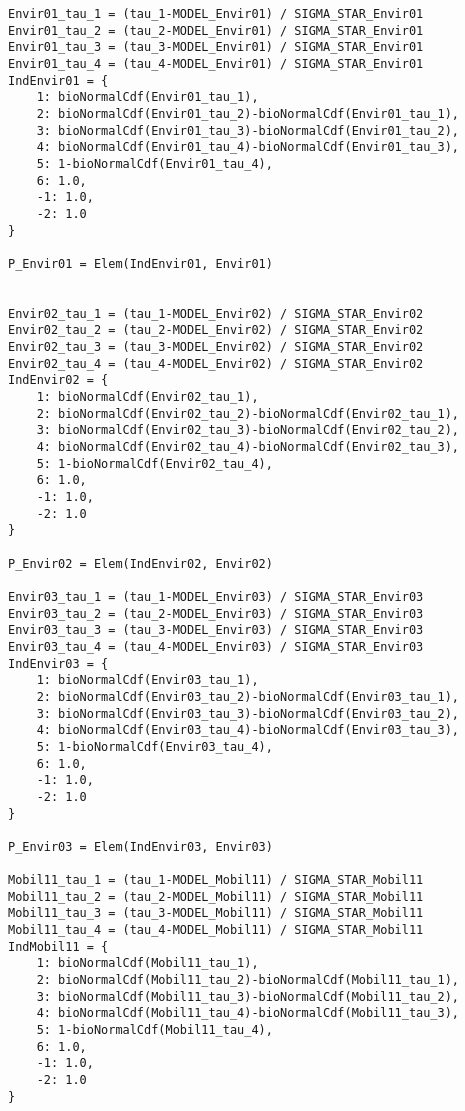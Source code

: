\documentclass[12pt,a4paper]{article}
\begin{document}
\begin{lstlisting}[style=numbers]
Envir01_tau_1 = (tau_1-MODEL_Envir01) / SIGMA_STAR_Envir01
Envir01_tau_2 = (tau_2-MODEL_Envir01) / SIGMA_STAR_Envir01
Envir01_tau_3 = (tau_3-MODEL_Envir01) / SIGMA_STAR_Envir01
Envir01_tau_4 = (tau_4-MODEL_Envir01) / SIGMA_STAR_Envir01
IndEnvir01 = {
    1: bioNormalCdf(Envir01_tau_1),
    2: bioNormalCdf(Envir01_tau_2)-bioNormalCdf(Envir01_tau_1),
    3: bioNormalCdf(Envir01_tau_3)-bioNormalCdf(Envir01_tau_2),
    4: bioNormalCdf(Envir01_tau_4)-bioNormalCdf(Envir01_tau_3),
    5: 1-bioNormalCdf(Envir01_tau_4),
    6: 1.0,
    -1: 1.0,
    -2: 1.0
}

P_Envir01 = Elem(IndEnvir01, Envir01)


Envir02_tau_1 = (tau_1-MODEL_Envir02) / SIGMA_STAR_Envir02
Envir02_tau_2 = (tau_2-MODEL_Envir02) / SIGMA_STAR_Envir02
Envir02_tau_3 = (tau_3-MODEL_Envir02) / SIGMA_STAR_Envir02
Envir02_tau_4 = (tau_4-MODEL_Envir02) / SIGMA_STAR_Envir02
IndEnvir02 = {
    1: bioNormalCdf(Envir02_tau_1),
    2: bioNormalCdf(Envir02_tau_2)-bioNormalCdf(Envir02_tau_1),
    3: bioNormalCdf(Envir02_tau_3)-bioNormalCdf(Envir02_tau_2),
    4: bioNormalCdf(Envir02_tau_4)-bioNormalCdf(Envir02_tau_3),
    5: 1-bioNormalCdf(Envir02_tau_4),
    6: 1.0,
    -1: 1.0,
    -2: 1.0
}

P_Envir02 = Elem(IndEnvir02, Envir02)

Envir03_tau_1 = (tau_1-MODEL_Envir03) / SIGMA_STAR_Envir03
Envir03_tau_2 = (tau_2-MODEL_Envir03) / SIGMA_STAR_Envir03
Envir03_tau_3 = (tau_3-MODEL_Envir03) / SIGMA_STAR_Envir03
Envir03_tau_4 = (tau_4-MODEL_Envir03) / SIGMA_STAR_Envir03
IndEnvir03 = {
    1: bioNormalCdf(Envir03_tau_1),
    2: bioNormalCdf(Envir03_tau_2)-bioNormalCdf(Envir03_tau_1),
    3: bioNormalCdf(Envir03_tau_3)-bioNormalCdf(Envir03_tau_2),
    4: bioNormalCdf(Envir03_tau_4)-bioNormalCdf(Envir03_tau_3),
    5: 1-bioNormalCdf(Envir03_tau_4),
    6: 1.0,
    -1: 1.0,
    -2: 1.0
}

P_Envir03 = Elem(IndEnvir03, Envir03)

Mobil11_tau_1 = (tau_1-MODEL_Mobil11) / SIGMA_STAR_Mobil11
Mobil11_tau_2 = (tau_2-MODEL_Mobil11) / SIGMA_STAR_Mobil11
Mobil11_tau_3 = (tau_3-MODEL_Mobil11) / SIGMA_STAR_Mobil11
Mobil11_tau_4 = (tau_4-MODEL_Mobil11) / SIGMA_STAR_Mobil11
IndMobil11 = {
    1: bioNormalCdf(Mobil11_tau_1),
    2: bioNormalCdf(Mobil11_tau_2)-bioNormalCdf(Mobil11_tau_1),
    3: bioNormalCdf(Mobil11_tau_3)-bioNormalCdf(Mobil11_tau_2),
    4: bioNormalCdf(Mobil11_tau_4)-bioNormalCdf(Mobil11_tau_3),
    5: 1-bioNormalCdf(Mobil11_tau_4),
    6: 1.0,
    -1: 1.0,
    -2: 1.0
}


\end{lstlisting}
\end{document}
